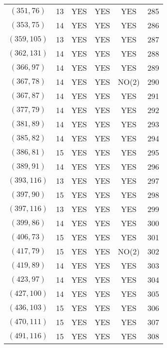 \begin{longtable}{|c|c|c|c|c|c|}
$(351, 76)$ & 13 & YES & YES & YES & 285\\
$(353, 75)$ & 14 & YES & YES & YES & 286\\
$(359, 105)$ & 13 & YES & YES & YES & 287\\
$(362, 131)$ & 14 & YES & YES & YES & 288\\
$(366, 97)$ & 14 & YES & YES & YES & 289\\
$(367, 78)$ & 14 & YES & YES & NO(2) & 290\\
$(367, 87)$ & 14 & YES & YES & YES & 291\\
$(377, 79)$ & 14 & YES & YES & YES & 292\\
$(381, 89)$ & 14 & YES & YES & YES & 293\\
$(385, 82)$ & 14 & YES & YES & YES & 294\\
$(386, 81)$ & 15 & YES & YES & YES & 295\\
$(389, 91)$ & 14 & YES & YES & YES & 296\\
$(393, 116)$ & 13 & YES & YES & YES & 297\\
$(397, 90)$ & 15 & YES & YES & YES & 298\\
$(397, 116)$ & 13 & YES & YES & YES & 299\\
$(399, 86)$ & 14 & YES & YES & YES & 300\\
$(406, 73)$ & 15 & YES & YES & YES & 301\\
$(417, 79)$ & 15 & YES & YES & NO(2) & 302\\
$(419, 89)$ & 14 & YES & YES & YES & 303\\
$(423, 97)$ & 14 & YES & YES & YES & 304\\
$(427, 100)$ & 14 & YES & YES & YES & 305\\
$(436, 103)$ & 15 & YES & YES & YES & 306\\
$(470, 111)$ & 15 & YES & YES & YES & 307\\
$(491, 116)$ & 15 & YES & YES & YES & 308
\end{longtable}
